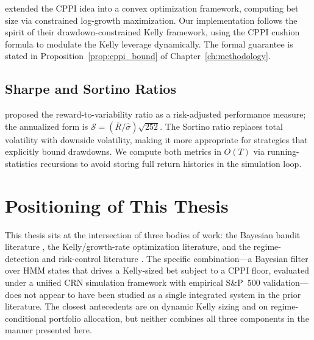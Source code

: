 \citet{busseti2016risk} extended the CPPI idea into a convex optimization
framework, computing bet size via constrained log-growth maximization.  Our
implementation follows the spirit of their drawdown-constrained Kelly framework,
using the CPPI cushion formula to modulate the Kelly leverage dynamically.  The
formal guarantee is stated in Proposition~\ref{prop:cppi_bound} of
Chapter~\ref{ch:methodology}.

\subsection{Sharpe and Sortino Ratios}

\citet{sharpe1966mutual} proposed the reward-to-variability ratio as a risk-adjusted
performance measure; the annualized form is
$\mathcal{S} = (\bar{R}/\hat\sigma)\sqrt{252}$.  The Sortino ratio \citep{sortino1991downside} replaces total volatility with downside volatility,
making it more appropriate for strategies that explicitly bound drawdowns.
We compute both metrics in $O(T)$ via running-statistics recursions to avoid
storing full return histories in the simulation loop.

\section{Positioning of This Thesis}

This thesis sits at the intersection of three bodies of work: the Bayesian
bandit literature \citep{thompson1933likelihood, auer2002finite, auer2002nonstochastic}, the Kelly/growth-rate optimization
literature, and the regime-detection and risk-control literature \citep{hamilton1989new, page1954, black1992theory}.  The specific combination---a Bayesian filter over HMM states that
drives a Kelly-sized bet subject to a CPPI floor, evaluated under a unified
CRN simulation framework with empirical S\&P~500 validation---does not appear
to have been studied as a single integrated system in the prior literature.
The closest antecedents are \citet{thorp2008} on dynamic Kelly sizing
and \citet{ang2002regime} on regime-conditional portfolio allocation, but
neither combines all three components in the manner presented here.
